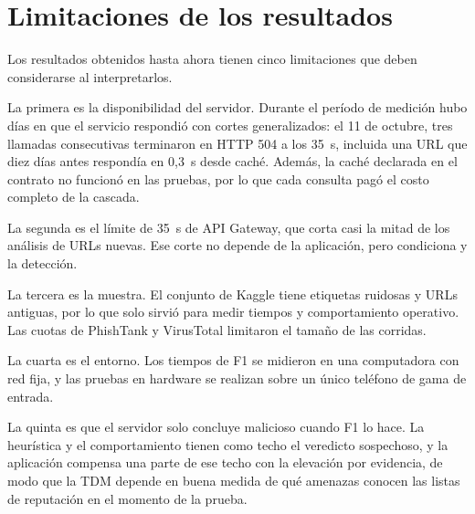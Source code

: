 
\section{Limitaciones de los resultados}

Los resultados obtenidos hasta ahora tienen cinco limitaciones que deben considerarse al interpretarlos.

La primera es la disponibilidad del servidor. Durante el período de medición hubo días en que el servicio respondió con cortes generalizados: el 11 de octubre, tres llamadas consecutivas terminaron en HTTP 504 a los 35~s, incluida una URL que diez días antes respondía en 0,3~s desde caché. Además, la caché declarada en el contrato no funcionó en las pruebas, por lo que cada consulta pagó el costo completo de la cascada.

La segunda es el límite de 35~s de API Gateway, que corta casi la mitad de los análisis de URLs nuevas. Ese corte no depende de la aplicación, pero condiciona \ttotal{} y la detección.

La tercera es la muestra. El conjunto de Kaggle tiene etiquetas ruidosas y URLs antiguas, por lo que solo sirvió para medir tiempos y comportamiento operativo. Las cuotas de PhishTank y VirusTotal limitaron el tamaño de las corridas.

La cuarta es el entorno. Los tiempos de F1 se midieron en una computadora con red fija, y las pruebas en hardware se realizan sobre un único teléfono de gama de entrada.

La quinta es que el servidor solo concluye malicioso cuando F1 lo hace. La heurística y el comportamiento tienen como techo el veredicto sospechoso, y la aplicación compensa una parte de ese techo con la elevación por evidencia, de modo que la TDM depende en buena medida de qué amenazas conocen las listas de reputación en el momento de la prueba.

